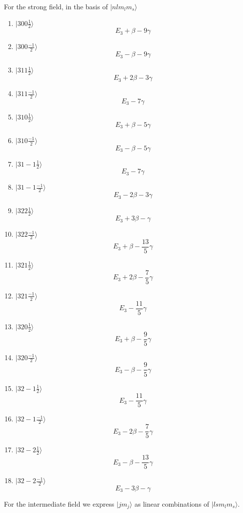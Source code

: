 For the strong field, in the basis of $|nlm_lm_s\rangle$
\begin{enumerate}
    \item $|300\frac{1}{2}\rangle$
    $$
    E_3 + \beta -9\gamma
    $$
    \item $|300\frac{-1}{2}\rangle$
    $$
    E_3 - \beta -9\gamma
    $$
    \item $|311\frac{1}{2}\rangle$
    $$
    E_3 + 2\beta -3\gamma
    $$
    \item $|311\frac{-1}{2}\rangle$
    $$
    E_3 -7\gamma
    $$
    \item $|310\frac{1}{2}\rangle$
    $$
    E_3 +\beta-5\gamma
    $$
    \item $|310\frac{-1}{2}\rangle$
    $$
    E_3 -\beta-5\gamma
    $$
    \item $|31-1\frac{1}{2}\rangle$
    $$
    E_3 -7\gamma
    $$
    \item $|31-1\frac{-1}{2}\rangle$
    $$
    E_3 -2 \beta-3\gamma
    $$
    \item $|322\frac{1}{2}\rangle$
    $$
    E_3 + 3\beta-\gamma
    $$
    \item $|322\frac{-1}{2}\rangle$
   $$
    E_3 + \beta-\frac{13}{5}\gamma
    $$
     \item $|321\frac{1}{2}\rangle$
    $$
    E_3 + 2\beta-\frac{7}{5}\gamma
    $$
    \item $|321\frac{-1}{2}\rangle$
    $$
    E_3 - \frac{11}{5}\gamma
    $$
    \item $|320\frac{1}{2}\rangle$
    $$
    E_3 + \beta-\frac{9}{5}\gamma
    $$
    \item $|320\frac{-1}{2}\rangle$
    $$
    E_3 - \beta-\frac{9}{5}\gamma
    $$
    \item $|32-1\frac{1}{2}\rangle$
    $$
    E_3 -\frac{11}{5}\gamma
    $$
    \item $|32-1\frac{-1}{2}\rangle$
    $$
    E_3 - 2\beta- \frac{7}{5}\gamma
    $$
    \item $|32-2\frac{1}{2}\rangle$
    $$
    E_3 - \beta-\frac{13}{5}\gamma
    $$
    \item $|32-2\frac{-1}{2}\rangle$
    $$
    E_3 - 3\beta-\gamma
    $$
\end{enumerate}
For the intermediate field we express $|jm_j\rangle$ as linear combinations of $|lsm_lm_s\rangle.$
